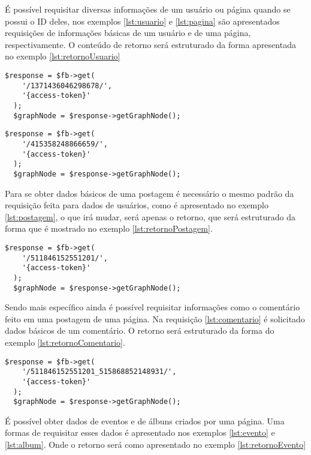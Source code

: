 É possível requisitar diversas informações de um usuário ou página quando se possui o ID deles, nos exemplos \ref{lst:usuario} e \ref{lst:pagina} são apresentados requisições de informações básicas de um usuário e de uma página, respectivamente. O conteúdo de retorno será estruturado da forma apresentada no exemplo \ref{lst:retornoUsuario}  

\begin{lstlisting}[caption={Requisitar informações de um usuário específico},label={lst:usuario}]
  $response = $fb->get(
    '/1371436046298678/',
    '{access-token}'
  );
  $graphNode = $response->getGraphNode();
\end{lstlisting}

\begin{lstlisting}[caption={Requisitar informações de uma página},label={lst:pagina}]
  $response = $fb->get(
    '/415358248866659/',
    '{access-token}'
  );
  $graphNode = $response->getGraphNode();
\end{lstlisting}

Para se obter dados básicos de uma postagem é necessário o mesmo padrão da requisição feita para dados de usuários, como é apresentado no exemplo \ref{lst:postagem}, o que irá mudar, será apenas o retorno, que será estruturado da forma que é mostrado no exemplo \ref{lst:retornoPostagem}.

\begin{lstlisting}[caption={Requisitar informações de uma postagem específica},label={lst:postagem}]
  $response = $fb->get(
    '/511846152551201/',
    '{access-token}'
  );
  $graphNode = $response->getGraphNode();
\end{lstlisting}

Sendo mais específico ainda é possível requisitar informações como o comentário feito em uma postagem de uma página. Na requisição \ref{lst:comentario} é solicitado dados básicos de um comentário. O retorno será estruturado da forma do exemplo \ref{lst:retornoComentario}.

\begin{lstlisting}[caption={Requisitar informações de um comentário específico},label={lst:comentario}]
  $response = $fb->get(
    '/511846152551201_515868852148931/',
    '{access-token}'
  );
  $graphNode = $response->getGraphNode();
\end{lstlisting}

É possível obter dados de eventos e de álbuns criados por uma página. Uma formas de requisitar esses dados é apresentado nos exemplos \ref{lst:evento} e \ref{lst:album}. Onde o retorno será como apresentado no exemplo \ref{lst:retornoEvento}

